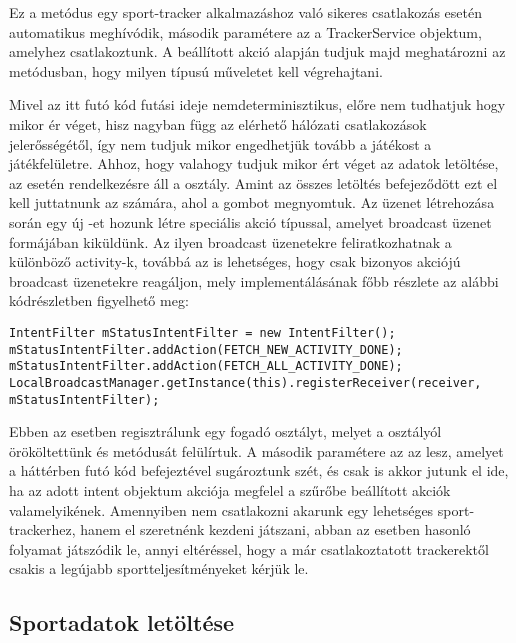 Ez a metódus egy sport-tracker alkalmazáshoz való sikeres csatlakozás esetén automatikus meghívódik, második paramétere az a TrackerService objektum, amelyhez csatlakoztunk. 
A beállított akció alapján tudjuk majd meghatározni az  metódusban, hogy milyen típusú műveletet kell végrehajtani. 

Mivel az itt futó kód futási ideje nemdeterminisztikus, előre nem tudhatjuk hogy mikor ér véget, hisz nagyban függ az elérhető hálózati csatlakozások jelerősségétől, így nem tudjuk mikor engedhetjük tovább a játékost a játékfelületre. 
Ahhoz, hogy valahogy tudjuk mikor ért véget az adatok letöltése, az  esetén rendelkezésre áll a  osztály. 
Amint az összes letöltés befejeződött ezt el kell juttatnunk az  számára, ahol a gombot megnyomtuk. 
Az üzenet létrehozása során egy új -et hozunk létre speciális akció típussal, amelyet broadcast üzenet formájában kiküldünk. 
Az ilyen broadcast üzenetekre feliratkozhatnak a különböző activity-k, továbbá az is lehetséges, hogy csak bizonyos akciójú broadcast üzenetekre reagáljon, mely implementálásának főbb részlete az alábbi kódrészletben figyelhető meg:

\begin{lstlisting}
IntentFilter mStatusIntentFilter = new IntentFilter();
mStatusIntentFilter.addAction(FETCH_NEW_ACTIVITY_DONE);
mStatusIntentFilter.addAction(FETCH_ALL_ACTIVITY_DONE);
LocalBroadcastManager.getInstance(this).registerReceiver(receiver, mStatusIntentFilter);
\end{lstlisting}

Ebben az esetben regisztrálunk egy fogadó osztályt, melyet a  osztályól örököltettünk és  metódusát felülírtuk. 
A második paramétere az az  lesz, amelyet a háttérben futó kód befejeztével sugároztunk szét, és csak is akkor jutunk el ide, ha az adott intent objektum akciója megfelel a szűrőbe beállított akciók valamelyikének. 
Amennyiben nem csatlakozni akarunk egy lehetséges sport-trackerhez, hanem el szeretnénk kezdeni játszani, abban az esetben hasonló folyamat játszódik le, annyi eltéréssel, hogy a már csatlakoztatott trackerektől csakis a legújabb sportteljesítményeket kérjük le. 

\subsection*{Sportadatok letöltése}
\label{trackerconnect}

